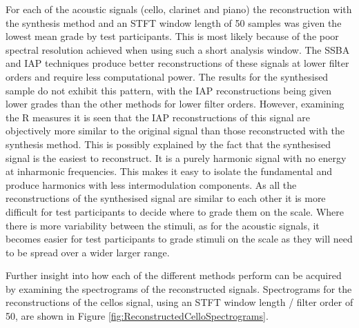 		For each of the acoustic signals (cello, clarinet and piano) the reconstruction with the synthesis method
		and an STFT window length of 50 samples was given the lowest mean grade by test participants. This is most
		likely because of the poor spectral resolution achieved when using such a short analysis window. The SSBA
		and IAP techniques produce better reconstructions of these signals at lower filter orders and require less
		computational power. The results for the synthesised sample do not exhibit this pattern, with the IAP
		reconstructions being given lower grades than the other methods for lower filter orders. However, examining
		the R measures it is seen that the IAP reconstructions of this signal are objectively more
		similar to the original signal than those reconstructed with the synthesis method. This is possibly
		explained by the fact that the synthesised signal is the easiest to reconstruct. It is a purely harmonic
		signal with no energy at inharmonic frequencies. This makes it easy to isolate the fundamental and produce
		harmonics with less intermodulation components. As all the reconstructions of the synthesised signal are
		similar to each other it is more difficult for test participants to decide where to grade them on the
		scale.  Where there is more variability between the stimuli, as for the acoustic signals, it becomes easier
		for test participants to grade stimuli on the scale as they will need to be spread over a wider larger
		range.

		Further insight into how each of the different methods perform can be acquired by examining the
		spectrograms of the reconstructed signals. Spectrograms for the reconstructions of the cellos signal, using
		an STFT window length / filter order of 50, are shown in Figure \ref{fig:ReconstructedCelloSpectrograms}.

